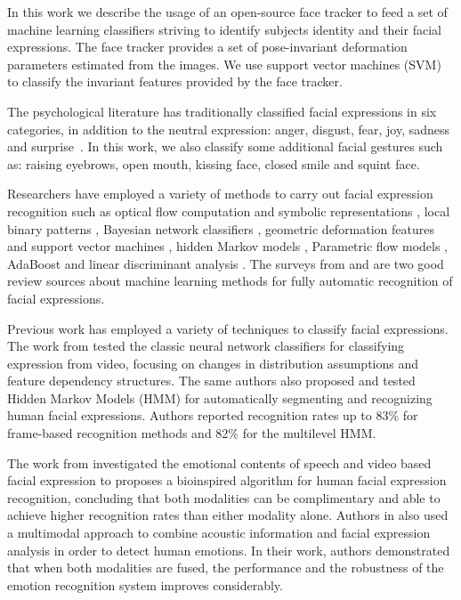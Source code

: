 \documentclass[]{article}
\begin{document}
In this work we describe the usage of an open-source face tracker to feed a set of machine learning classifiers striving
to identify subjects identity and their facial expressions. The face
tracker provides a set of pose-invariant deformation parameters
estimated from the images. We use support vector machines (SVM)
to classify the invariant features provided by the face tracker.


The psychological literature has traditionally classified facial
expressions in six categories, in addition to the neutral expression:
anger, disgust, fear, joy, sadness and
surprise~\cite{schmidt2002human}. In this work, we also classify some additional facial gestures such as: raising
eyebrows, open mouth, kissing face, closed smile and squint face.


Researchers have employed a variety of methods to carry out facial expression recognition such as optical flow
computation  and symbolic representations \cite{Yacoob506414}, local binary patterns \cite{Shan2009803},  Bayesian
network classifiers \cite{Cohen1211408}, geometric deformation features and support vector machines
\cite{kotsia4032815}, hidden Markov models \cite{aleksic1597130, Cohen2003160}, Parametric flow models
\cite{blackAndYacoob}, AdaBoost and linear discriminant analysis \cite{bartlett1398364}. The surveys from
\cite{bartlett1398364} and \cite{Fasel2003259} are two good review sources about machine learning methods 
for fully automatic recognition of facial expressions. 


Previous work has employed a variety of techniques to classify  facial expressions. The work from \cite{Cohen2003160}
tested the classic neural network classifiers for classifying expression from video, focusing on changes in distribution
assumptions and feature dependency structures. The same authors also proposed and tested Hidden Markov Models (HMM) for
automatically segmenting and recognizing human facial expressions. Authors reported recognition rates up to 83\% for
frame-based recognition methods and 82\% for the multilevel HMM.


The work from \cite{Chen670976} investigated the emotional contents of speech and video based facial expression to
proposes a bioinspired algorithm for human facial expression recognition, concluding that both modalities can be
complimentary and able to achieve higher recognition rates than either modality alone. Authors in \cite{Busso:2004} also
used a multimodal approach to combine acoustic information and facial expression analysis in order to detect human
emotions. In their work, authors demonstrated that when both modalities are fused, the performance and the robustness of
the emotion recognition system improves considerably.
\end{document}
